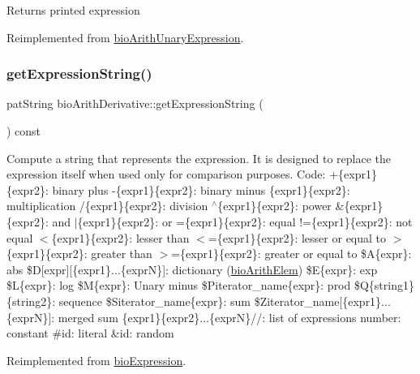 \begin{DoxyReturn}{Returns}
printed expression 
\end{DoxyReturn}


Reimplemented from \hyperlink{classbio_arith_unary_expression_a974b7779804861f331a75e08db377926}{bio\+Arith\+Unary\+Expression}.

\mbox{\label{classbio_arith_derivative_ae2e8d614fcf2e46d43759c6bab201f30}} 
\subsubsection{\texorpdfstring{get\+Expression\+String()}{getExpressionString()}}
{\footnotesize\ttfamily pat\+String bio\+Arith\+Derivative\+::get\+Expression\+String (\begin{DoxyParamCaption}{ }\end{DoxyParamCaption}) const\hspace{0.3cm}{\ttfamily [virtual]}}

Compute a string that represents the expression. It is designed to replace the expression itself when used only for comparison purposes. Code\+: +\{expr1\}\{expr2\}\+: binary plus -\/\{expr1\}\{expr2\}\+: binary minus \{expr1\}\{expr2\}\+: multiplication /\{expr1\}\{expr2\}\+: division $^\wedge$\{expr1\}\{expr2\}\+: power \&\{expr1\}\{expr2\}\+: and $\vert$\{expr1\}\{expr2\}\+: or =\{expr1\}\{expr2\}\+: equal !=\{expr1\}\{expr2\}\+: not equal $<$\{expr1\}\{expr2\}\+: lesser than $<$=\{expr1\}\{expr2\}\+: lesser or equal to $>$\{expr1\}\{expr2\}\+: greater than $>$=\{expr1\}\{expr2\}\+: greater or equal to \$A\{expr\}\+: abs \$D\mbox{[}expr\mbox{]}\mbox{[}\{expr1\}...\{exprN\}\mbox{]}\+: dictionary (\hyperlink{classbio_arith_elem}{bio\+Arith\+Elem}) \$E\{expr\}\+: exp \$L\{expr\}\+: log \$M\{expr\}\+: Unary minus \$\+Piterator\+\_\+name\{expr\}\+: prod \$Q\{string1\}\{string2\}\+: sequence \$\+Siterator\+\_\+name\{expr\}\+: sum \$\+Ziterator\+\_\+name\mbox{[}\{expr1\}...\{exprN\}\mbox{]}\+: merged sum \{expr1\}\{expr2\}...\{exprN\}//\+: list of expressions number\+: constant \#id\+: literal \&id\+: random 

Reimplemented from \hyperlink{classbio_expression_a3e4b4dca58dbbc6f0e411b30eb3f60b4}{bio\+Expression}.

